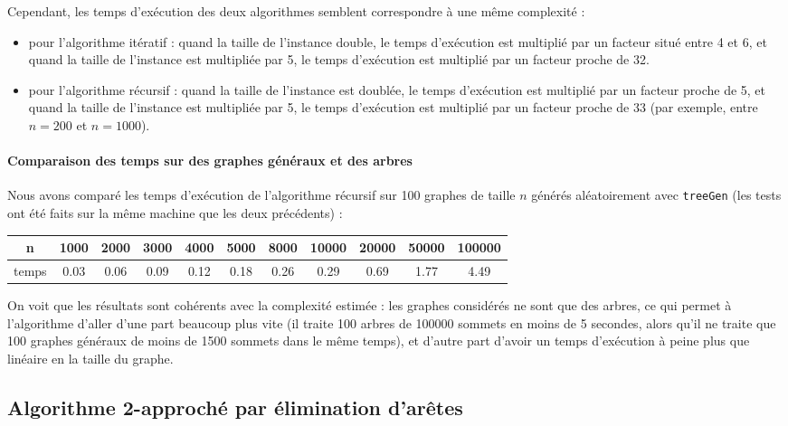\documentclass[a4paper,10pt]{article}
\begin{document}
Cependant, les temps d'exécution des deux algorithmes semblent correspondre à une même complexité : 
\begin{itemize}
\item pour l'algorithme itératif : quand la taille de l'instance double, le temps d'exécution est multiplié par un facteur situé entre 4 et 6, et quand la taille de l'instance est multipliée par 5, le temps d'exécution est multiplié par un facteur proche de 32.
\item pour l'algorithme récursif : quand la taille de l'instance est doublée, le temps d'exécution est multiplié par un facteur proche de 5, et quand la taille de l'instance est multipliée par 5, le temps d'exécution est multiplié par un facteur proche de 33 (par exemple, entre $n = 200$ et $n = 1000$).
\end{itemize}

\paragraph{Comparaison des temps sur des graphes généraux et des arbres}

Nous avons comparé les temps d'exécution de l'algorithme récursif sur 100 graphes de taille $n$ générés aléatoirement avec \texttt{treeGen} (les tests ont été faits sur la même machine que les deux précédents) :
\begin{center}
\begin{tabular}{|c|c|c|c|c|c|c|c|c|c|c|}
	\hline 
	n & 1000 & 2000 & 3000 & 4000 & 5000 & 8000 & 10000 & 20000 & 50000 & 100000 \\
	\hline
	temps & 0.03 & 0.06 & 0.09 & 0.12 & 0.18 & 0.26 & 0.29 & 0.69 & 1.77 & 4.49\\
	\hline
\end{tabular}
\end{center}

On voit que les résultats sont cohérents avec la complexité estimée : les graphes considérés ne sont que des arbres, ce qui permet à l'algorithme d'aller d'une part beaucoup plus vite (il traite 100 arbres de 100000 sommets en moins de 5 secondes, alors qu'il ne traite que 100 graphes généraux de moins de 1500 sommets dans le même temps), et d'autre part d'avoir un temps d'exécution à peine plus que linéaire en la taille du graphe.


\subsection{Algorithme 2-approché par élimination d'arêtes}
\end{document}
